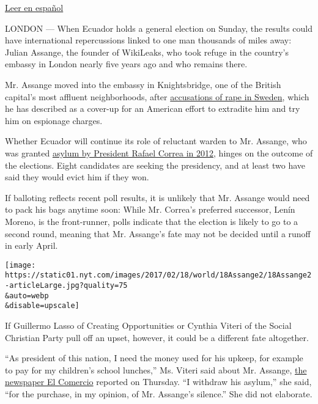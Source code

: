 \href{https://www.nytimes.com/es/2017/02/17/con-las-elecciones-en-ecuador-queda-incierto-el-futuro-de-julian-assange/}{Leer
en español}

LONDON --- When Ecuador holds a general election on Sunday, the results
could have international repercussions linked to one man thousands of
miles away: Julian Assange, the founder of WikiLeaks, who took refuge in
the country's embassy in London nearly five years ago and who remains
there.

Mr. Assange moved into the embassy in Knightsbridge, one of the British
capital's most affluent neighborhoods, after
\href{https://www.nytimes.com/2016/12/07/world/europe/assange-gives-detailed-account-of-rape-accusation.html}{accusations
of rape in Sweden}, which he has described as a cover-up for an American
effort to extradite him and try him on espionage charges.

Whether Ecuador will continue its role of reluctant warden to Mr.
Assange, who was granted
\href{http://www.nytimes.com/2012/08/17/world/americas/ecuador-to-let-assange-stay-in-its-embassy.html}{asylum
by President Rafael Correa in 2012}, hinges on the outcome of the
elections. Eight candidates are seeking the presidency, and at least two
have said they would evict him if they won.

If balloting reflects recent poll results, it is unlikely that Mr.
Assange would need to pack his bags anytime soon: While Mr. Correa's
preferred successor, Lenín Moreno, is the front-runner, polls indicate
that the election is likely to go to a second round, meaning that Mr.
Assange's fate may not be decided until a runoff in early April.

\texttt{[image: https://static01.nyt.com/images/2017/02/18/world/18Assange2/18Assange2-articleLarge.jpg?quality=75\\\&auto=webp\\\&disable=upscale]}

If Guillermo Lasso of Creating Opportunities or Cynthia Viteri of the
Social Christian Party pull off an upset, however, it could be a
different fate altogether.

``As president of this nation, I need the money used for his upkeep, for
example to pay for my children's school lunches,'' Ms. Viteri said about
Mr. Assange,
\href{http://elcomercio.pe/mundo/latinoamerica/ecuador-viteri-retirara-asilo-assange-si-gana-elecciones-noticia-1969235}{the
newspaper El Comercio} reported on Thursday. ``I withdraw his asylum,''
she said, ``for the purchase, in my opinion, of Mr. Assange's silence.''
She did not elaborate.

